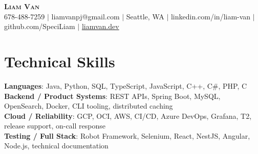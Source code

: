 \documentclass[letterpaper,11pt]{article}
\begin{document}

%
\begin{center}
    \textbf{\Huge \scshape Liam Van} \\ \vspace{1pt}
    \small 678-488-7259 $|$ \small {liamvanpj@gmail.com} $|$ Seattle, WA
 {{$|$ linkedin.com/in/liam-van} {$|$ github.com/SpeciLiam} {$|$ \href{https://liamvan.dev}{liamvan.dev}}}

\end{center}

\section{Technical Skills}
 \begin{itemize}[leftmargin=0.15in, label={}]
    \small{\item{
     \textbf{Languages}{: Java, Python, SQL, TypeScript, JavaScript, C++, C\#, PHP, C} \\
     \textbf{Backend / Product Systems}{: REST APIs, Spring Boot, MySQL, OpenSearch, Docker, CLI tooling, distributed caching} \\
     \textbf{Cloud / Reliability}{: GCP, OCI, AWS, CI/CD, Azure DevOps, Grafana, T2, release support, on-call response} \\
     \textbf{Testing / Full Stack}{: Robot Framework, Selenium, React, NestJS, Angular, Node.js, technical documentation} \\
    }}
 \end{itemize}
%

\end{document}
